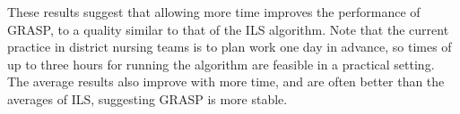 \documentclass[a4paper,11pt,authoryear]{elsarticle}
\begin{document}
\noindent These results suggest that allowing more time improves the performance of GRASP, to a quality similar to that of the ILS algorithm. Note that the current practice in district nursing teams is to plan work one day in advance, so times of up to three hours for running the algorithm are feasible in a practical setting. The average results also improve with more time, and are often better than the averages of ILS, suggesting GRASP is more stable. 
\end{document}
